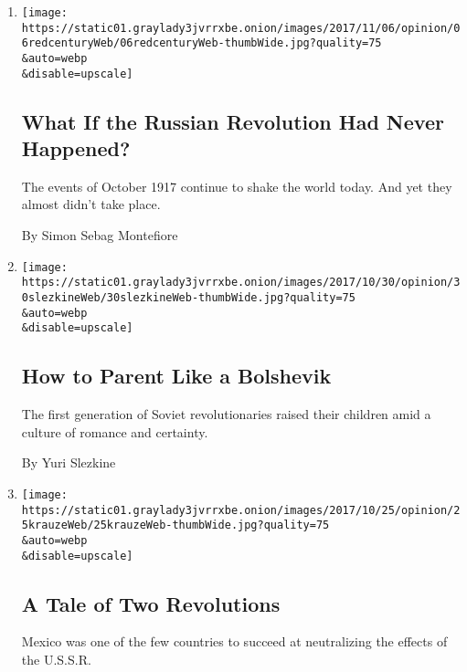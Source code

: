 \begin{enumerate}
\def\labelenumi{\arabic{enumi}.}
\item
  \href{/2017/11/06/opinion/russian-revolution-october.html}{}

  \texttt{[image: https://static01.graylady3jvrrxbe.onion/images/2017/11/06/opinion/06redcenturyWeb/06redcenturyWeb-thumbWide.jpg?quality=75\\\&auto=webp\\\&disable=upscale]}

  \hypertarget{what-if-the-russian-revolution-had-never-happened}{%
  \subsection{What If the Russian Revolution Had Never
  Happened?}\label{what-if-the-russian-revolution-had-never-happened}}

  The events of October 1917 continue to shake the world today. And yet
  they almost didn't take place.

  By Simon Sebag Montefiore
\item
  \href{/2017/10/30/opinion/how-to-parent-like-a-bolshevik.html}{}

  \texttt{[image: https://static01.graylady3jvrrxbe.onion/images/2017/10/30/opinion/30slezkineWeb/30slezkineWeb-thumbWide.jpg?quality=75\\\&auto=webp\\\&disable=upscale]}

  \hypertarget{how-to-parent-like-a-bolshevik}{%
  \subsection{How to Parent Like a
  Bolshevik}\label{how-to-parent-like-a-bolshevik}}

  The first generation of Soviet revolutionaries raised their children
  amid a culture of romance and certainty.

  By Yuri Slezkine
\item
  \href{/2017/10/25/opinion/mexico-soviet-russian-revolution.html}{}

  \texttt{[image: https://static01.graylady3jvrrxbe.onion/images/2017/10/25/opinion/25krauzeWeb/25krauzeWeb-thumbWide.jpg?quality=75\\\&auto=webp\\\&disable=upscale]}

  \hypertarget{a-tale-of-two-revolutions}{%
  \subsection{A Tale of Two
  Revolutions}\label{a-tale-of-two-revolutions}}

  Mexico was one of the few countries to succeed at neutralizing the
  effects of the U.S.S.R.


\end{enumerate}
